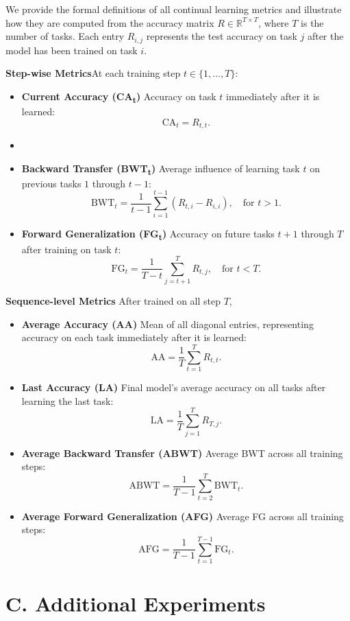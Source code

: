 \documentclass[letterpaper]{article} %
\begin{document}
We provide the formal definitions of all continual learning metrics and illustrate how they are computed from the accuracy matrix $R \in \mathbb{R}^{T \times T}$, where $T$ is the number of tasks. Each entry $R_{i,j}$ represents the test accuracy on task $j$ after the model has been trained on task $i$.

\textbf{Step-wise Metrics}At each training step $t \in \{1, \dots, T\}$:

\begin{itemize}
    \item  \textbf{Current Accuracy (CA\textsubscript{t})}  Accuracy on task $t$ immediately after it is learned:
$$\mathrm{CA}_t = R_{t,t}.$$
 \item
\item \textbf{Backward Transfer (BWT\textsubscript{t})}  
Average influence of learning task $t$ on previous tasks $1$ through $t{-}1$:
\[
\mathrm{BWT}_t = \frac{1}{t - 1} \sum_{i=1}^{t - 1} \left(R_{t,i} - R_{i,i}\right), \quad \text{for } t > 1.
\]
\item \textbf{Forward Generalization (FG\textsubscript{t})}  
Accuracy on future tasks $t{+}1$ through $T$ after training on task $t$:
\[
\mathrm{FG}_t = \frac{1}{T - t} \sum_{j = t + 1}^{T} R_{t,j}, \quad \text{for } t < T.
\]
\end{itemize}

\textbf{Sequence-level Metrics} After trained on all step $T$,
\begin{itemize}
    \item  \textbf{Average Accuracy (AA)}  
Mean of all diagonal entries, representing accuracy on each task immediately after it is learned:
\[
\mathrm{AA} = \frac{1}{T} \sum_{t=1}^{T} R_{t,t}.
\]
\item \textbf{Last Accuracy (LA)}  
Final model’s average accuracy on all tasks after learning the last task:
\[
\mathrm{LA} = \frac{1}{T} \sum_{j=1}^{T} R_{T,j}.
\]
\item \textbf{Average Backward Transfer (ABWT)}  
Average BWT across all training steps:
\[
\mathrm{ABWT} = \frac{1}{T - 1} \sum_{t=2}^{T} \mathrm{BWT}_t.
\]
\item \textbf{Average Forward Generalization (AFG)}  
Average FG across all training steps:
\[
\mathrm{AFG} = \frac{1}{T - 1} \sum_{t=1}^{T - 1} \mathrm{FG}_t.
\]
\end{itemize}






\section{C. Additional Experiments}
\end{document}
